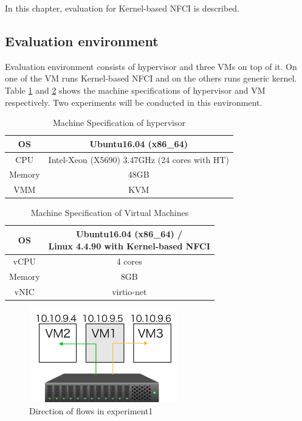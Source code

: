In this chapter, evaluation for Kernel-based NFCI is described. 
\subsection{Evaluation environment}
Evaluation environment consists of hypervisor and three VMs on top of it. On one of the VM runs Kernel-based NFCI and on the others runs generic kernel. Table \ref{tbl: spec1} and \ref{tbl: spec2} shows the machine specifications of hypervisor and VM respectively. Two experiments will be conducted in this environment.  

\begin{table}
	\centering
	\begin{tabular}{|c||c|}
		\hline
		OS & Ubuntu16.04 (x86\_64) \\
		\hline
		CPU & Intel-Xeon (X5690) 3.47GHz (24 cores with HT) \\
		\hline
		Memory & 48GB \\
		\hline
		VMM & KVM \\
		\hline
	\end{tabular}
	\caption{Machine Specification of hypervisor}
	\label{tbl: spec1}
\end{table}

\begin{table}
	\centering
	\begin{tabular}{|c||c|}
		\hline
		OS &  \shortstack{Ubuntu16.04 (x86\_64) / \\ Linux 4.4.90 with Kernel-based NFCI} \tabularnewline
		\hline
		vCPU & 4 cores \tabularnewline
		\hline
		Memory & 8GB \tabularnewline
		\hline
		vNIC & virtio-net \tabularnewline
		\hline
	\end{tabular}
	\caption{Machine Specification of Virtual Machines} 
	\label{tbl: spec2}
\end{table}

\begin{figure}
	\centering
	\includegraphics[width=65mm]{pics/env1.pdf}
	\caption{Direction of flows in experiment1}
	\label{fig: exp1}
\end{figure}

